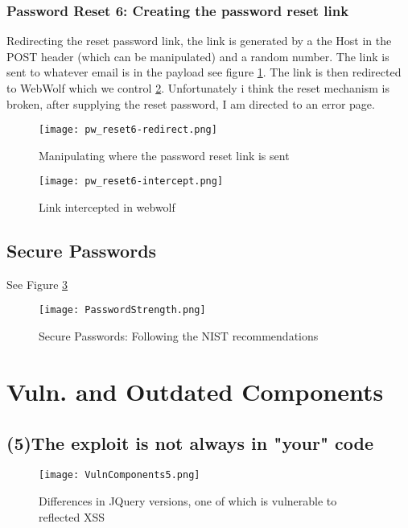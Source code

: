 \documentclass[
	letterpaper, %
	10pt, %
	unnumberedsections, %
	twoside, %
]{APAAssignment}
\begin{document}
\begin{appendices}
\subsubsection{Password Reset 6: Creating the password reset link}\label{app:pwReset6}

Redirecting the reset password link, the link is generated by a the Host in the POST header (which can be manipulated) and a  random number. The link is sent to whatever email is in the payload see figure \ref{fig:app:pwreset-redirect}. The link is then redirected to WebWolf which we control \ref{fig:app:pwreset-intercept}. Unfortunately i think the reset mechanism is broken, after supplying the reset password, I am directed to an error page. 

\begin{figure}[!htp] %
	\centering
	\texttt{[image: pw\_reset6-redirect.png]}
	\caption{Manipulating where the password reset link is sent}
	\label{fig:app:pwreset-redirect}
\end{figure}

\begin{figure}[!htp] %
	\centering
	\texttt{[image: pw\_reset6-intercept.png]}
	\caption{Link intercepted in webwolf}
	\label{fig:app:pwreset-intercept}
\end{figure}


\subsection{Secure Passwords}
See Figure \ref{fig:app:SecurePW}

\begin{figure}[!htp] %
	\centering
	\texttt{[image: PasswordStrength.png]}
	\caption{Secure Passwords: Following the NIST recommendations}
	\label{fig:app:SecurePW}
\end{figure}


\section{Vuln. and Outdated Components}\label{app:VulnAndOutdatedComponents}
\subsection{(5)The exploit is not always in "your" code}\label{app:VulnAndOutdatedComponents5}

\begin{figure}[!ht] %
	\centering
	\texttt{[image: VulnComponents5.png]}
	\caption{Differences in JQuery versions, one of which is vulnerable to reflected XSS }
	\label{fig:app:vuln5}
\end{figure}


\end{appendices}
\end{document}

